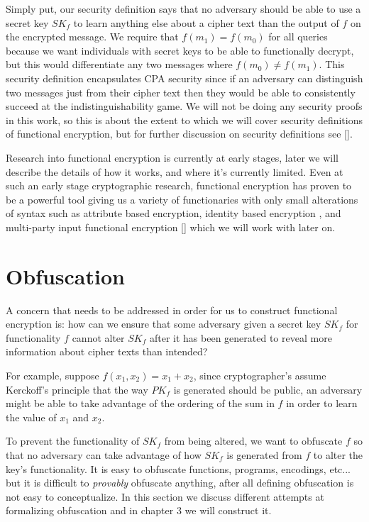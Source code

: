 \documentclass[12pt,twoside]{reedthesis}
\begin{document}
\par Simply put, our security definition says that no adversary should be able to use a secret key $SK_f$ to learn anything else about a cipher text than the output of $f$ on the encrypted message. We require that $f(m_1)=f(m_0)$ for all queries because we want individuals with secret keys to be able to functionally decrypt, but this would differentiate any two messages where $f(m_0) \not= f(m_1)$. This security definition encapsulates CPA security since if an adversary can distinguish two messages just from their cipher text then they would be able to consistently succeed at the indistinguishability game. We will not be doing any security proofs in this work, so this is about the extent to which we will cover security definitions of functional encryption, but for further discussion on security definitions see [\cite{funcenc}].

\par Research into functional encryption is currently at early stages, later we will describe the details of how it works, and where it's currently limited. Even at such an early stage cryptographic research, functional encryption has proven to be a powerful tool giving us a variety of functionaries with only small alterations of syntax such as attribute based encryption, identity based encryption , and multi-party input functional encryption [\cite{funcenc}] which we will work with later on. 

    
    

    \section{Obfuscation}
    A concern that needs to be addressed in order for us to construct functional encryption is: how can we ensure that some adversary given a secret key $SK_f$ for functionality $f$ cannot alter $SK_f$ after it has been generated to reveal more information about cipher texts than intended? 
    \par For example, suppose $f(x_1,x_2) = x_1 + x_2$, since cryptographer's assume Kerckoff's principle that the way $PK_f$ is generated should be public, an adversary might be able to take advantage of the ordering of the sum in $f$ in order to learn the value of $x_1$ and $x_2$.
    \par To prevent the functionality of $SK_f$ from being altered, we want to obfuscate $f$ so that no adversary can take advantage of how $SK_f$ is generated from $f$ to alter the key's functionality. It is easy to obfuscate functions, programs, encodings, etc... but it is difficult to \textit{provably} obfuscate anything, after all defining obfuscation is not easy to conceptualize. In this section we discuss different attempts at formalizing obfuscation and in chapter 3 we will construct it.
    
\end{document}
